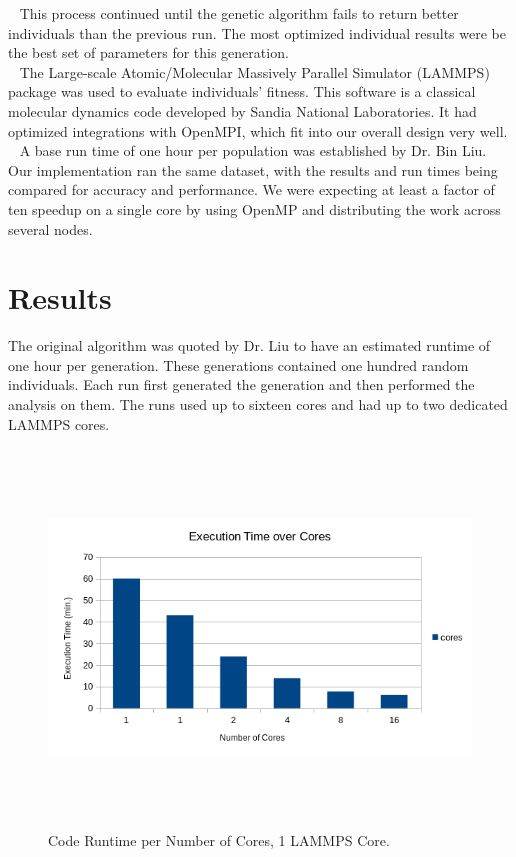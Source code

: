 \documentclass[letterpaper, 12pt]{article}
\begin{document}
\begin{flushleft}
~\newline 
This process continued until the genetic algorithm fails to return better individuals than the previous run. The most optimized individual results were be the best set of parameters for this generation. \\
~\newline
The Large-scale Atomic/Molecular Massively Parallel Simulator (LAMMPS) package was used to evaluate individuals' fitness.  This software is a classical molecular dynamics code developed by Sandia National Laboratories.  It had optimized integrations with OpenMPI, which fit into our overall design very well. \\
~\newline 
A base run time of one hour per population was established by Dr. Bin Liu.  Our implementation ran the same dataset, with the results and run times being compared for accuracy and performance.  We were expecting at least a factor of ten speedup on a single core by using OpenMP and distributing the work across several nodes.\\

\newpage
\section*{Results}
The original algorithm was quoted by Dr. Liu to have an estimated runtime of one hour per generation.  These generations contained one hundred random individuals.  Each run first generated the generation and then performed the analysis on them.  The runs used up to sixteen cores and had up to two dedicated LAMMPS cores.

\begin{figure}[H]
	\includegraphics[width=\linewidth,height=10cm,keepaspectratio]{results.png}
	\caption[Run Times per Core]{Code Runtime per Number of Cores, 1 LAMMPS Core.}
	\label{fig:runtimes1core}
\end{figure}


\end{flushleft}
\end{document}
